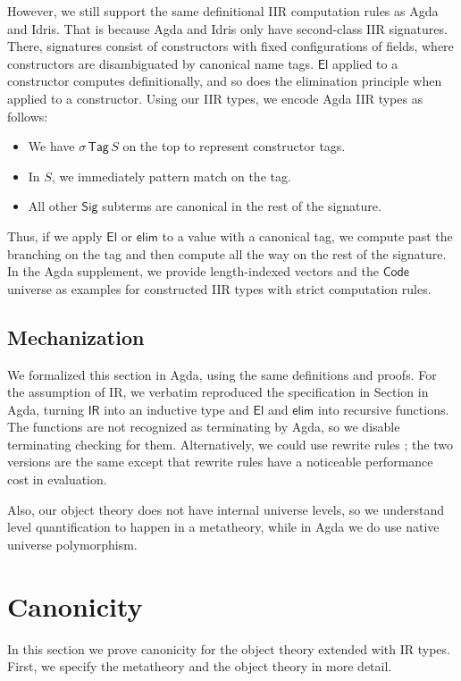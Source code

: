 \documentclass[acmsmall,screen,review,anonymous]{acmart}
\newcommand{\msf}[1]{{\mathsf{#1}}}
\newcommand{\El}{\msf{El}}
\newcommand{\Sig}{\msf{Sig}}
\newcommand{\Code}{\msf{Code}}
\newcommand{\Tag}{\msf{Tag}}
\newcommand{\IR}{\msf{IR}}
\newcommand{\elim}{\msf{elim}}
\begin{document}
However, we still support the same definitional IIR computation rules as Agda and Idris. That is
because Agda and Idris only have second-class IIR signatures. There, signatures consist of
constructors with fixed configurations of fields, where constructors are disambiguated by canonical
name tags. $\El$ applied to a constructor computes definitionally, and so does the elimination
principle when applied to a constructor. Using our IIR types, we encode Agda IIR types as follows:
\begin{itemize}
\item We have $\sigma\,\Tag\,S$ on the top to represent constructor tags.
\item In $S$, we immediately pattern match on the tag.
\item All other $\Sig$ subterms are canonical in the rest of the signature.
\end{itemize}
Thus, if we apply $\El$ or $\elim$ to a value with a canonical tag, we compute past the branching on
the tag and then compute all the way on the rest of the signature. In the Agda supplement, we provide
length-indexed vectors and the $\Code$ universe as examples for constructed IIR types with strict
computation rules.

\subsection{Mechanization}

We formalized this section in Agda, using the same definitions and proofs. For the assumption of IR,
we verbatim reproduced the specification in Section \cite{TODO} in Agda, turning $\IR$ into an
inductive type and $\El$ and $\elim$ into recursive functions. The functions are not recognized as
terminating by Agda, so we disable terminating checking for them. Alternatively, we could use
rewrite rules \cite{TODO}; the two versions are the same except that rewrite rules have a noticeable
performance cost in evaluation.

Also, our object theory does not have internal universe levels, so we understand level
quantification to happen in a metatheory, while in Agda we do use native universe polymorphism.

\section{Canonicity}\label{sec:canonicity}

In this section we prove canonicity for the object theory extended with IR types. First, we specify
the metatheory and the object theory in more detail.
\end{document}
